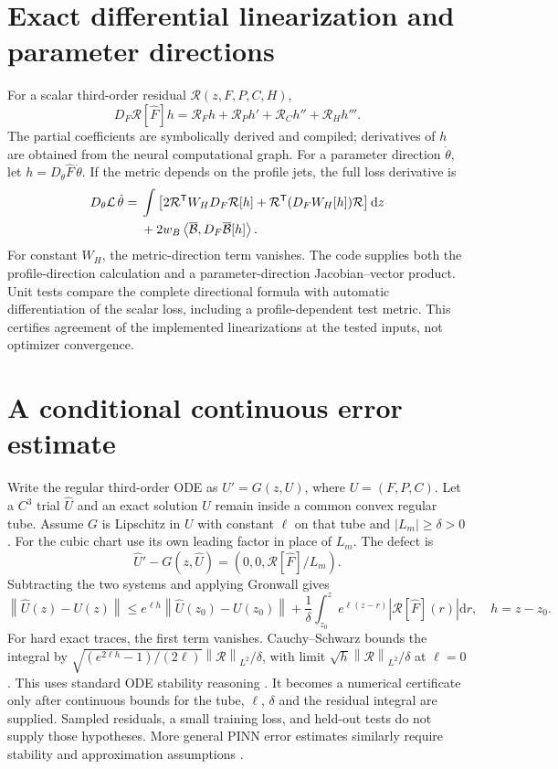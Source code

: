 \documentclass[12pt,a4paper,oneside]{report}
\numberwithin{equation}{chapter}
\newcommand{\R}{\mathcal R}
\newcommand{\dd}{\mathrm d}
\newcommand{\norm}[1]{\left\lVert#1\right\rVert}
\begin{document}
\section{Exact differential linearization and parameter directions}
For a scalar third-order residual $\R(z,F,P,C,H)$,
\begin{equation}\label{eq:linearization}
D_F\R[\widehat F]h=\R_Fh+\R_Ph'+\R_Ch''+\R_Hh'''.
\end{equation}
The partial coefficients are symbolically derived and compiled; derivatives
of $h$ are obtained from the neural computational graph. For a parameter
direction $\dot\theta$, let $h=D_\theta\widehat F\,\dot\theta$. If the metric
depends on the profile jets, the full loss derivative is
\begin{align}\label{eq:directionalloss}
D_\theta\mathcal L\,\dot\theta
={}&\int\left[2\R^{\mathsf T}W_H D_F\R[h]
 +\R^{\mathsf T}(D_FW_H[h])\R\right]\dd z\\
&+2w_B\left\langle\overline{\mathcal B},
 D_F\overline{\mathcal B}[h]\right\rangle.\notag
\end{align}
For constant $W_H$, the metric-direction term vanishes. The code supplies
both the profile-direction calculation and a parameter-direction
Jacobian--vector product. Unit tests compare the complete directional formula
with automatic differentiation of the scalar loss, including a
profile-dependent test metric. This certifies agreement of the implemented
linearizations at the tested inputs, not optimizer convergence.

\section{A conditional continuous error estimate}\label{sec:conditional-error}
Write the regular third-order ODE as $U'=G(z,U)$, where $U=(F,P,C)$.
Let a $C^3$ trial $\widehat U$ and an exact solution $U$ remain inside a common
convex regular tube. Assume $G$ is Lipschitz in $U$ with constant $\ell$ on
that tube and $|L_m|\geq\delta>0$. For the cubic chart use its own leading
factor in place of $L_m$. The defect is
\begin{equation}
\widehat U'-G(z,\widehat U)=(0,0,\R[\widehat F]/L_m).
\end{equation}
Subtracting the two systems and applying Gronwall gives
\begin{equation}\label{eq:gronwall}
\norm{\widehat U(z)-U(z)}\leq e^{\ell h}\norm{\widehat U(z_0)-U(z_0)}
 +\frac1\delta\int_{z_0}^{z}e^{\ell(z-r)}|\R[\widehat F](r)|\dd r,
\quad h=z-z_0.
\end{equation}
For hard exact traces, the first term vanishes. Cauchy--Schwarz bounds the
integral by
$\sqrt{(e^{2\ell h}-1)/(2\ell)}\norm{\R}_{L^2}/\delta$, with limit
$\sqrt h\norm{\R}_{L^2}/\delta$ at $\ell=0$.
This uses standard ODE stability reasoning \cite{teschl2012}. It becomes a
numerical certificate only after continuous bounds for the tube, $\ell$,
$\delta$ and the residual integral are supplied. Sampled residuals, a small
training loss, and held-out tests do not supply those hypotheses.
More general PINN error estimates similarly require stability and
approximation assumptions \cite{mishra2023}.
\end{document}
